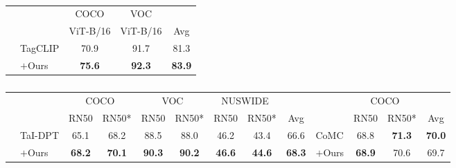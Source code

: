 \begin{table}[ht]
\vspace{-10pt}
\centering
\begin{tabular}{llcc|c}
\toprule
    &             &           COCO &            VOC &               \\
    &             &       ViT-B/16 &       ViT-B/16 &            Avg \\
\midrule
 & TagCLIP &           70.9 &           91.7 &           81.3 \\
    & $+$Ours &           \textbf{75.6} &           \textbf{92.3} &  \textbf{83.9} \\
\bottomrule
\end{tabular}
\vspace{-5pt}
\caption{\captionCompetitionTagCLIPlogYESrowcalibbaseNO}
\label{tab:CompetitionTagCLIPlogYESrowcalibbaseNO}
\vspace{-16pt}
\end{table}

\begin{table*}[ht]
\centering
\begin{tabular}{llcccccc|c||lcc|c}
\toprule
    &  & \multicolumn{2}{c}{COCO} & \multicolumn{2}{c}{VOC} & \multicolumn{2}{c}{NUSWIDE} &    & & \multicolumn{2}{c}{COCO} & \\
    & &  RN50 & RN50* & RN50 & RN50* & RN50 & RN50* & Avg & & RN50 & RN50* & Avg\\
\midrule
 & TaI-DPT & 65.1 & 68.2 & 88.5 & 88.0 & 46.2 & 43.4 & 66.6 & CoMC & 68.8 & \textbf{71.3} & \textbf{70.0} \\
    & $+$Ours &  \textbf{68.2} & \textbf{70.1} &  \textbf{90.3} &  \textbf{90.2} &  \textbf{46.6} & \textbf{44.6} & \textbf{68.3} & $+$Ours & \textbf{68.9} & 70.6 & 69.7 \\
\bottomrule
\end{tabular}
\vspace{-5pt}
\caption{\captionCompetitionTaIDPTandCoMC}
\label{tab:CompetitionTaIDPTandCoMC}
\end{table*}


